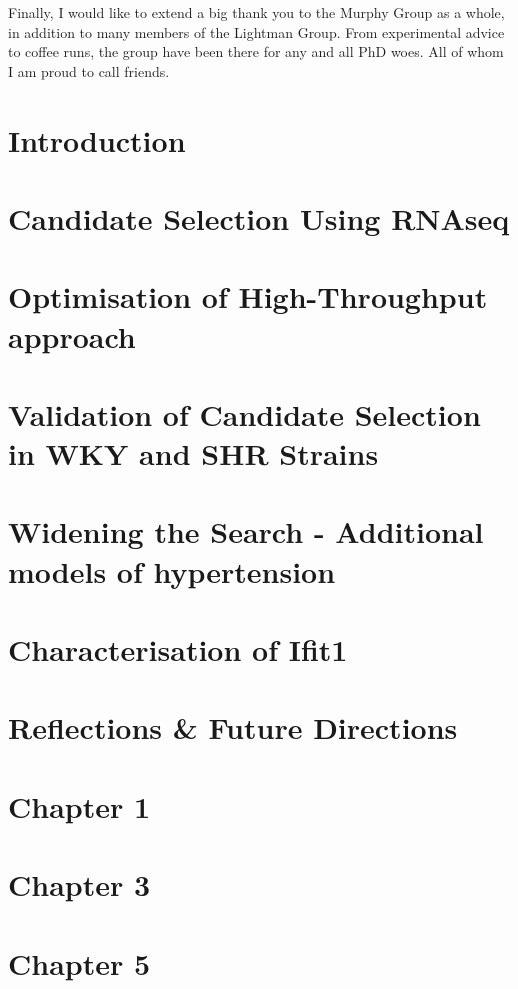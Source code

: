 \documentclass[12pt]{report}
\begin{document}
Finally, I would like to extend a big thank you to the Murphy Group as a whole, in addition to many members of the Lightman Group. From experimental advice to coffee runs, the group have been there for any and all PhD woes. All of whom I am proud to call friends. \\
%
\tableofcontents
%
\listoffigures
%
\listoftables
%
%
\printnoidxglossaries
%
\chapter{Introduction} 

%
\chapter{Candidate Selection Using RNAseq}

%
\chapter{Optimisation of High-Throughput approach}

%
\chapter{Validation of Candidate Selection in WKY and SHR Strains}

%
\chapter{Widening the Search - Additional models of hypertension}

%
\chapter{Characterisation of Ifit1}

%
\chapter{Reflections \& Future Directions}

%
\appendix
\chapter{Chapter 1}

\chapter{Chapter 3}

\chapter{Chapter 5}

%
\end{document}

